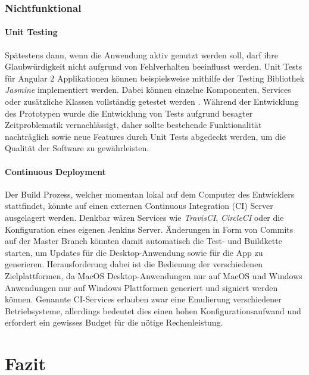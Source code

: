 \subsection{Nichtfunktional}


\subsubsection{Unit Testing}

Spätestens dann, wenn die Anwendung aktiv genutzt werden soll, darf ihre Glaubwürdigkeit nicht aufgrund von Fehlverhalten beeinflusst werden.
Unit Tests für Angular 2 Applikationen können beispielsweise mithilfe der Testing Bibliothek \emph{Jasmine} implementiert werden.
Dabei können einzelne Komponenten, Services oder zusätzliche Klassen vollständig getestet werden \cite{Angul78:online}.
Während der Entwicklung des Prototypen \projectname{} wurde die Entwicklung von Tests aufgrund besagter Zeitproblematik vernachlässigt,
daher sollte bestehende Funktionalität nachträglich sowie neue Features durch Unit Tests abgedeckt werden, um die Qualität der Software zu gewährleisten.

\subsubsection{Continuous Deployment}

Der Build Prozess, welcher momentan lokal auf dem Computer des Entwicklers stattfindet, könnte auf einen externen Continuous Integration (CI) Server ausgelagert werden.
Denkbar wären Services wie \emph{TravisCI}, \emph{CircleCI} oder die Konfiguration eines eigenen Jenkins Server.
Änderungen in Form von Commits auf der Master Branch könnten damit automatisch die Test- und Buildkette starten, um Updates für die Desktop-Anwendung sowie für die App zu generieren.
Herausforderung dabei ist die Bedienung der verschiedenen Zielplattformen, da MacOS Desktop-Anwendungen nur auf MacOS und
Windows Anwendungen nur auf Windows Plattformen generiert und signiert werden können.
Genannte CI-Services erlauben zwar eine Emulierung verschiedener Betriebsysteme,
allerdings bedeutet dies einen hohen Konfigurationsaufwand und erfordert ein gewisses Budget für die nötige Rechenleistung.


\chapter{Fazit}

